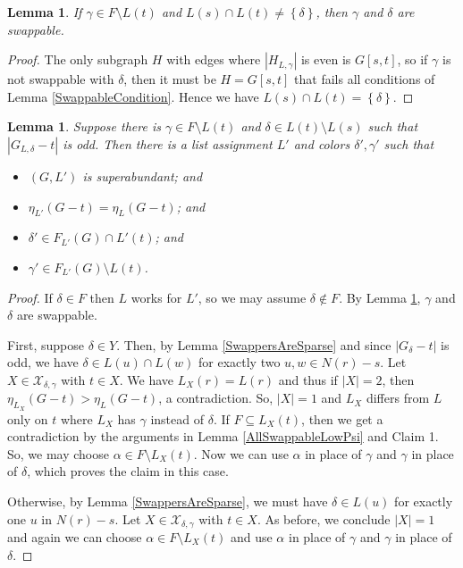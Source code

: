 \documentclass[12pt]{article}
\theoremstyle{plain}
\newtheorem{lem}[thm]{Lemma}
\theoremstyle{definition}
\theoremstyle{remark}
\newcommand{\fancy}[1]{\mathcal{#1}}
\newcommand{\set}[1]{\left\{ #1 \right\}}
\newcommand{\card}[1]{\left|#1\right|}
\def\X{\fancy{X}}
\begin{document}
	\begin{lem}\label{SingleGammaMuchSwappage}
		If $\gamma \in F \setminus L(t)$ and $L(s) \cap L(t) \ne \set{\delta}$, then $\gamma$ and $\delta$ are swappable.
	\end{lem}
	\begin{proof}
			The only subgraph $H$ with edges where $\card{H_{L, \gamma}}$ is even is $G[s, t]$, so if $\gamma$ is not swappable with $\delta$, then it must be $H = G[s, t]$ that fails all conditions of Lemma \ref{SwappableCondition}.  Hence we have $L(s) \cap L(t) = \set{\delta}$.
	\end{proof}
	
	\begin{lem}\label{Odd_delta}
		Suppose there is $\gamma \in F \setminus L(t)$ and $\delta \in L(t) \setminus L(s)$ such that $\card{G_{L, \delta} - t}$ is odd.  Then there is a list assignment $L'$ and colors $\delta', \gamma'$ such that
		\begin{itemize}
			\item $(G, L')$ is superabundant; and
			\item $\eta_{L'}(G - t) = \eta_L(G-t)$; and
			\item $\delta' \in F_{L'}(G) \cap L'(t)$; and
			\item $\gamma' \in F_{L'}(G) \setminus L(t)$.
		\end{itemize}
	\end{lem}
	\begin{proof}
		If $\delta \in F$ then $L$ works for $L'$, so we may assume $\delta \not \in F$.  By Lemma \ref{SingleGammaMuchSwappage}, $\gamma$ and $\delta$ are swappable.
		
		First, suppose $\delta \in Y$. Then, by Lemma \ref{SwappersAreSparse} and since $\card{G_\delta - t}$ is odd, we have $\delta \in L(u) \cap L(w)$ for exactly two $u,w \in N(r) - s$.   Let $X \in \X_{\delta,\gamma}$ with $t \in X$.  We have $L_X(r) = L(r)$ and thus if $|X| = 2$, then $\eta_{L_X}(G - t) > \eta_L(G - t)$, a contradiction.  So, $|X| = 1$ and $L_X$ differs from $L$ only on $t$ where $L_X$ has $\gamma$ instead of $\delta$. If $F \subseteq L_X(t)$, then we get a contradiction by the arguments in Lemma \ref{AllSwappableLowPsi} and Claim 1.  So, we may choose $\alpha \in F \setminus L_X(t)$. Now we can use $\alpha$ in place of $\gamma$ and $\gamma$ in place of $\delta$, which proves the claim in this case.
		
		Otherwise, by Lemma \ref{SwappersAreSparse}, we must have $\delta \in L(u)$ for exactly one $u$ in $N(r) - s$.  Let $X \in \X_{\delta,\gamma}$ with $t \in X$. As before, we conclude $|X| = 1$ and again we can choose $\alpha \in F \setminus L_X(t)$ and use $\alpha$ in place of $\gamma$ and $\gamma$ in place of $\delta$.
	\end{proof}
	
\end{document}
